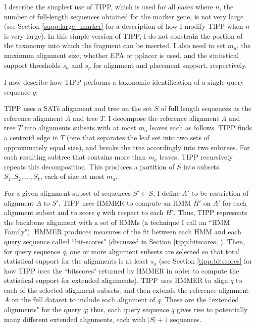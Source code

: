 I describe the simplest use of TIPP, which is
used for all cases where $n$, the number of full-length sequences
obtained for the marker gene, is not very large (see Section \ref{supp:large_marker}
 for a description of how I modify TIPP when $n$ is very large).  In this simple version of 
TIPP, I do not constrain the portion of the taxonomy
into which the fragment can be inserted.  I also need to set
$m_a$, the maximum alignment size, whether EPA or pplacer is used,
and the statistical support thresholds $s_a$ and
$s_p$ for alignment and placement support, respectively.

I now describe how TIPP performs
a taxonomic identification of a single query sequence $q$:

   TIPP uses a SAT\'{e}
alignment and tree on the set $S$ of full
length sequences as the reference alignment $A$ and tree $T$.  I decompose the
reference alignment $A$ and tree $T$ 
into alignments subsets with at most $m_a$ leaves each as follows.  
TIPP finds a centroid edge in $T$ (one that
separates the leaf set into two sets of
approximately equal size), and breaks the tree accordingly into two subtrees.
For each resulting subtree that contains more than $m_a$ leaves, 
TIPP recursively repeats this decomposition.
This produces a partition of $S$  into subsets $S_1, S_2, \ldots, S_k$,
each of size at most $m_a$.

For a given alignment subset of sequences $S' \subset S$, 
I define $A'$ to be restriction of alignment $A$ to $S'$.
TIPP uses HMMER to compute an HMM $H'$ on $A'$ for each alignment subset
and to score $q$ with respect to each $H'$.
Thus, TIPP represents the backbone alignment with a set of
HMMs (a technique I call an ``HMM
Family").
HMMER produces measures of the fit between
each HMM and each query sequence called ``bit-scores" (discussed in
Section \ref{tipp:bitscores}
).  Then, for query sequence $q$, 
one or more alignment subsets are selected so that total statistical support for the alignments 
is at least $s_a$ (see Section \ref{tipp:bitscores}
for how TIPP uses the ``bitscores" returned by
HMMER in order to compute the statistical support for extended alignments).  TIPP uses HMMER to align $q$ to each of the selected alignment subsets, and
then extends the reference alignment $A$ on the full dataset to include each alignment of $q$.
These are the ``extended alignments" for the query $q$;
thus, each query sequence $q$ gives rise to potentially many different extended
alignments, each with $|S|+1$ sequences.

